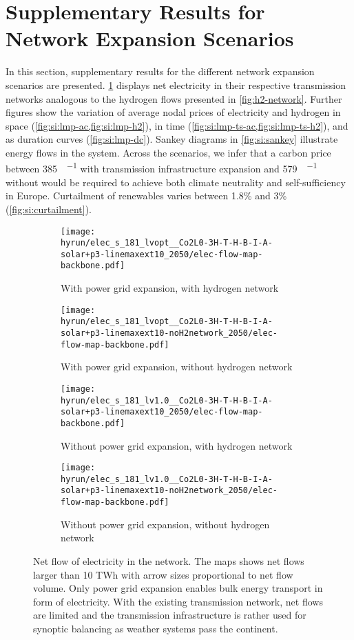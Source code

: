 

\section{Supplementary Results for Network Expansion Scenarios}
\label{sec:si:results-network-expansion}

In this section, supplementary results for the different network expansion
scenarios are presented. \cref{fig:si:flow-ac} displays net electricity in their
respective transmission networks analogous to the hydrogen flows presented in
\cref{fig:h2-network}. Further figures show the variation of average nodal
prices of electricity and hydrogen in space
(\cref{fig:si:lmp-ac,fig:si:lmp-h2}), in time
(\cref{fig:si:lmp-ts-ac,fig:si:lmp-ts-h2}), and as duration curves
(\cref{fig:si:lmp-dc}). Sankey diagrams in \cref{fig:si:sankey} illustrate
energy flows in the system. Across the scenarios, we infer that a carbon price
between \SI{385}{\sieuro\per\tco} with transmission infrastructure expansion and
\SI{579}{\sieuro\per\tco} without would be required to achieve both climate
neutrality and self-sufficiency in Europe. Curtailment of renewables varies between 1.8\% and 3\% (\cref{fig:si:curtailment}).

\begin{figure}
    \begin{subfigure}{0.49\textwidth}
        \centering
        \caption{With power grid expansion, with hydrogen network}
        \texttt{[image: \\hyrun/elec\_s\_181\_lvopt\_\_Co2L0-3H-T-H-B-I-A-solar+p3-linemaxext10\_2050/elec-flow-map-backbone.pdf]}
    \end{subfigure}
    \begin{subfigure}{0.49\textwidth}
        \centering
        \caption{With power grid expansion, without hydrogen network}
        \texttt{[image: \\hyrun/elec\_s\_181\_lvopt\_\_Co2L0-3H-T-H-B-I-A-solar+p3-linemaxext10-noH2network\_2050/elec-flow-map-backbone.pdf]}
    \end{subfigure}
    \begin{subfigure}{0.49\textwidth}
        \centering
        \caption{Without power grid expansion, with hydrogen network}
        \texttt{[image: \\hyrun/elec\_s\_181\_lv1.0\_\_Co2L0-3H-T-H-B-I-A-solar+p3-linemaxext10\_2050/elec-flow-map-backbone.pdf]}
    \end{subfigure}
    \begin{subfigure}{0.49\textwidth}
        \centering
        \caption{Without power grid expansion, without hydrogen network}
        \texttt{[image: \\hyrun/elec\_s\_181\_lv1.0\_\_Co2L0-3H-T-H-B-I-A-solar+p3-linemaxext10-noH2network\_2050/elec-flow-map-backbone.pdf]}
    \end{subfigure}
    \caption{Net flow of electricity in the network. The maps shows net flows larger than 10 TWh with arrow sizes proportional to net flow volume. Only power grid expansion enables bulk energy transport in form of electricity. With the existing transmission network, net flows are limited and the transmission infrastructure is rather used for synoptic balancing as weather systems pass the continent.}
    \label{fig:si:flow-ac}
\end{figure}

